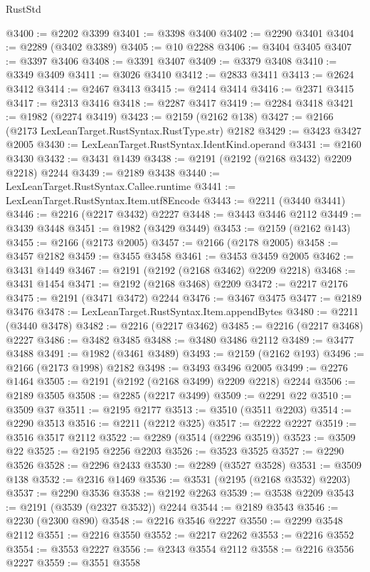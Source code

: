 \begin{lexlean}{RustStd}
\begin{coremodule}
@3400 := @2202 @3399
@3401 := @3398 @3400
@3402 := @2290 @3401
@3404 := @2289 (@3402 @3389)
@3405 := @10 @2288
@3406 := @3404 @3405
@3407 := @3397 @3406
@3408 := @3391 @3407
@3409 := @3379 @3408
@3410 := @3349 @3409
@3411 := @3026 @3410
@3412 := @2833 @3411
@3413 := @2624 @3412
@3414 := @2467 @3413
@3415 := @2414 @3414
@3416 := @2371 @3415
@3417 := @2313 @3416
@3418 := @2287 @3417
@3419 := @2284 @3418
@3421 := @1982 (@2274 @3419)
@3423 := @2159 (@2162 @138)
@3427 := @2166 (@2173 LexLeanTarget.RustSyntax.RustType.str) @2182
@3429 := @3423 @3427 @2005
@3430 := LexLeanTarget.RustSyntax.IdentKind.operand
@3431 := @2160 @3430
@3432 := @3431 @1439
@3438 := @2191 (@2192 (@2168 @3432) @2209 @2218) @2244
@3439 := @2189 @3438
@3440 := LexLeanTarget.RustSyntax.Callee.runtime
@3441 := LexLeanTarget.RustSyntax.Item.utf8Encode
@3443 := @2211 (@3440 @3441)
@3446 := @2216 (@2217 @3432) @2227
@3448 := @3443 @3446 @2112
@3449 := @3439 @3448
@3451 := @1982 (@3429 @3449)
@3453 := @2159 (@2162 @143)
@3455 := @2166 (@2173 @2005)
@3457 := @2166 (@2178 @2005)
@3458 := @3457 @2182
@3459 := @3455 @3458
@3461 := @3453 @3459 @2005
@3462 := @3431 @1449
@3467 := @2191 (@2192 (@2168 @3462) @2209 @2218)
@3468 := @3431 @1454
@3471 := @2192 (@2168 @3468) @2209
@3472 := @2217 @2176
@3475 := @2191 (@3471 @3472) @2244
@3476 := @3467 @3475
@3477 := @2189 @3476
@3478 := LexLeanTarget.RustSyntax.Item.appendBytes
@3480 := @2211 (@3440 @3478)
@3482 := @2216 (@2217 @3462)
@3485 := @2216 (@2217 @3468) @2227
@3486 := @3482 @3485
@3488 := @3480 @3486 @2112
@3489 := @3477 @3488
@3491 := @1982 (@3461 @3489)
@3493 := @2159 (@2162 @193)
@3496 := @2166 (@2173 @1998) @2182
@3498 := @3493 @3496 @2005
@3499 := @2276 @1464
@3505 := @2191 (@2192 (@2168 @3499) @2209 @2218) @2244
@3506 := @2189 @3505
@3508 := @2285 (@2217 @3499)
@3509 := @2291 @22
@3510 := @3509 @37
@3511 := @2195 @2177
@3513 := @3510 (@3511 @2203)
@3514 := @2290 @3513
@3516 := @2211 (@2212 @325)
@3517 := @2222 @2227
@3519 := @3516 @3517 @2112
@3522 := @2289 (@3514 (@2296 @3519))
@3523 := @3509 @22
@3525 := @2195 @2256 @2203
@3526 := @3523 @3525
@3527 := @2290 @3526
@3528 := @2296 @2433
@3530 := @2289 (@3527 @3528)
@3531 := @3509 @138
@3532 := @2316 @1469
@3536 := @3531 (@2195 (@2168 @3532) @2203)
@3537 := @2290 @3536
@3538 := @2192 @2263
@3539 := @3538 @2209
@3543 := @2191 (@3539 (@2327 @3532)) @2244
@3544 := @2189 @3543
@3546 := @2230 (@2300 @890)
@3548 := @2216 @3546 @2227
@3550 := @2299 @3548 @2112
@3551 := @2216 @3550
@3552 := @2217 @2262
@3553 := @2216 @3552
@3554 := @3553 @2227
@3556 := @2343 @3554 @2112
@3558 := @2216 @3556 @2227
@3559 := @3551 @3558

\end{coremodule}
\end{lexlean}
